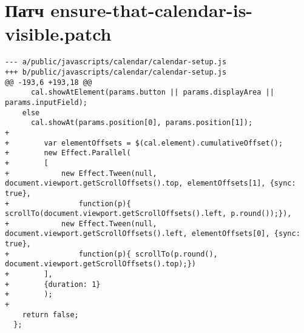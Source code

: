 \section{Патч ensure-that-calendar-is-visible.patch}
\label{appendix:ensure-that-calendar-is-visible.patch}
\small{\begin{lstlisting}
--- a/public/javascripts/calendar/calendar-setup.js
+++ b/public/javascripts/calendar/calendar-setup.js
@@ -193,6 +193,18 @@
      cal.showAtElement(params.button || params.displayArea || params.inputField);
    else
      cal.showAt(params.position[0], params.position[1]);
+
+        var elementOffsets = $(cal.element).cumulativeOffset();
+        new Effect.Parallel(
+        [
+            new Effect.Tween(null, document.viewport.getScrollOffsets().top, elementOffsets[1], {sync: true},
+                function(p){ scrollTo(document.viewport.getScrollOffsets().left, p.round());}),
+            new Effect.Tween(null, document.viewport.getScrollOffsets().left, elementOffsets[0], {sync: true},
+                function(p){ scrollTo(p.round(), document.viewport.getScrollOffsets().top);})
+        ],
+        {duration: 1}
+        );
+
    return false;
  };
\end{lstlisting}}

